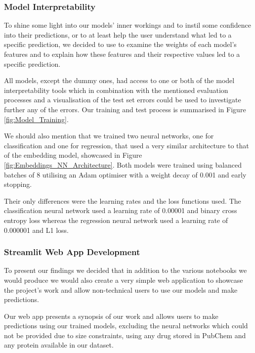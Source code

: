 \subsubsection{Model Interpretability}
\label{subsubsec:Model_Interpretability}

To shine some light into our models' inner workings and to instil some confidence into their predictions, or to at least help the user understand what led to a specific prediction, we decided to use \citet{ELI5} to examine the weights of each model's features and \citet{LIME} to explain how these features and their respective values led to a specific prediction.

All models, except the dummy ones, had access to one or both of the model interpretability tools which in combination with the mentioned evaluation processes and a visualisation of the test set errors could be used to investigate further any of the errors. Our training and test process is summarised in Figure \ref{fig:Model_Training}.

We should also mention that we trained two neural networks, one for classification and one for regression, that used a very similar architecture to that of the embedding model, showcased in Figure \ref{fig:Embeddings_NN_Architecture}. Both models were trained using balanced batches of 8 utilising an Adam optimiser with a weight decay of 0.001 and early stopping. 

Their only differences were the learning rates and the loss functions used. The classification neural network used a learning rate of 0.00001 and binary cross entropy loss whereas the regression neural network used a learning rate of 0.000001 and L1 loss.

\subsubsection{Streamlit Web App Development}

To present our findings we decided that in addition to the various notebooks we would produce we would also create a very simple \citet{Streamlit} web application to showcase the project's work and allow non-technical users to use our models and make predictions.

Our web app presents a synopsis of our work and allows users to make predictions using our trained models, excluding the neural networks which could not be provided due to size constraints, using any drug stored in PubChem \citep{PubChem} and any protein available in our dataset.

